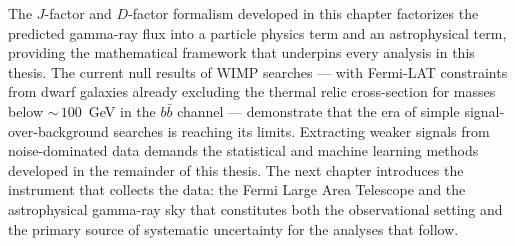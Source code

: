 The $J$-factor and $D$-factor formalism developed in this chapter factorizes the predicted gamma-ray flux into a particle physics term and an astrophysical term, providing the mathematical framework that underpins every analysis in this thesis.
The current null results of WIMP searches --- with Fermi-LAT constraints from dwarf galaxies already excluding the thermal relic cross-section for masses below ${\sim}\,100$~GeV in the $b\bar{b}$ channel --- demonstrate that the era of simple signal-over-background searches is reaching its limits.
Extracting weaker signals from noise-dominated data demands the statistical and machine learning methods developed in the remainder of this thesis.
The next chapter introduces the instrument that collects the data: the Fermi Large Area Telescope and the astrophysical gamma-ray sky that constitutes both the observational setting and the primary source of systematic uncertainty for the analyses that follow.

